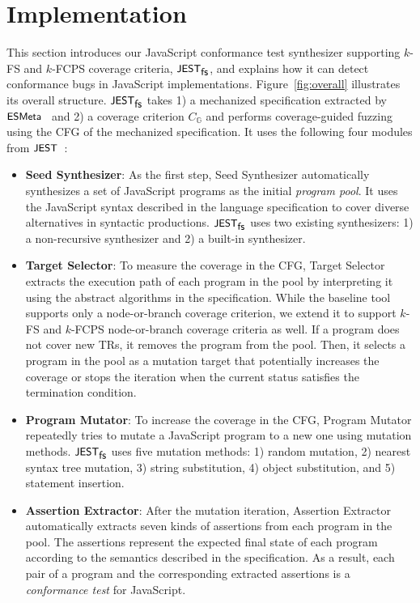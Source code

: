 \documentclass[acmsmall,review,screen]{acmart}
\newcommand{\name}[1]{\textsf{#1}}
\newcommand{\sname}[1]{\name{\small #1}}
\newcommand{\jest}{\sname{JEST}}
\newcommand{\esmeta}{\sname{ESMeta}}
\newcommand{\tool}{\jest_{\sname{fs}}}
\newcommand{\graph}{\mathbb{G}}
\newcommand{\cov}[1]{C_{#1}}
\begin{document}
\section{Implementation}\label{sec:impl}

This section introduces our JavaScript
conformance test synthesizer supporting $k$-FS and $k$-FCPS coverage criteria,
$\tool$, and explains how it can detect conformance bugs in JavaScript implementations.
Figure~\ref{fig:overall} illustrates its overall structure.
$\tool$ takes 1) a mechanized specification extracted by $\esmeta$~\cite{esmeta}
and 2) a coverage criterion $\cov{\graph}$ and performs
coverage-guided fuzzing~\cite{afl} using the CFG of the mechanized specification.
It uses the following four modules from $\jest$~\cite{jest}:
\begin{itemize}
  \item \textsf{\textbf{Seed Synthesizer}}:
    As the first step, \textsf{Seed Synthesizer} automatically synthesizes a set
    of JavaScript programs as the initial \textit{program pool}.
    It uses the JavaScript syntax described in the language specification to
    cover diverse alternatives in syntactic productions.
    $\tool$ uses two existing synthesizers: 1) a non-recursive synthesizer and
    2) a built-in synthesizer.
  \item \textsf{\textbf{Target Selector}}:
    To measure the coverage in the CFG, \textsf{Target Selector} extracts the
    execution path of each program in the pool by interpreting it using the
    abstract algorithms in the specification.
    While the baseline tool supports only a node-or-branch coverage criterion,
    we extend it to support $k$-FS and $k$-FCPS node-or-branch coverage
    criteria as well.
    If a program does not cover new TRs, it removes the program from the pool.
    Then, it selects a program in the pool as a mutation target that potentially
    increases the coverage or stops the iteration when the current status
    satisfies the termination condition.
  \item \textsf{\textbf{Program Mutator}}:
    To increase the coverage in the CFG, \textsf{Program Mutator} repeatedly
    tries to mutate a JavaScript program to a new one using mutation methods.
    $\tool$ uses five mutation methods: 1) random mutation, 2)
    nearest syntax tree mutation, 3) string substitution, 4) object
    substitution, and 5) statement insertion.
  \item \textsf{\textbf{Assertion Extractor}}:
    After the mutation iteration, \textsf{Assertion Extractor} automatically
    extracts seven kinds of assertions from each program in the pool.
    The assertions represent the expected final state of each program according
    to the semantics described in the specification.
    As a result, each pair of a program and the corresponding extracted
    assertions is a \textit{conformance test} for JavaScript.
\end{itemize}
\end{document}
